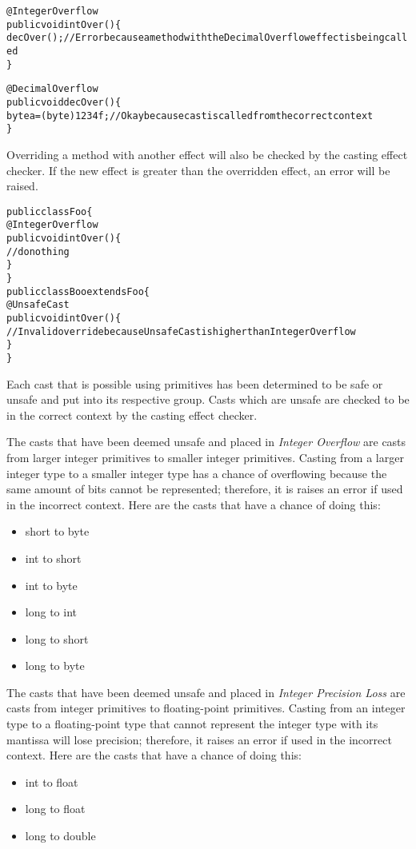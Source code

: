 \begin{alltt}
@IntegerOverflow
public void intOver() \{
    decOver(); //Error because a method with the DecimalOverflow effect is being called
\}

@DecimalOverflow
public void decOver() \{
    byte a = (byte) 1234f; //Okay because cast is called from the correct context
\}
\end{alltt}

Overriding a method with another effect will also be checked by the casting effect checker. If the new effect is greater than the overridden effect, an error will be raised.

\begin{alltt}
public class Foo \{
    @IntegerOverflow
    public void intOver() \{
        //do nothing
    \}
\}
public class Boo extends Foo \{
    @UnsafeCast
    public void intOver() \{
        //Invalid override because UnsafeCast is higher than IntegerOverflow
    \}
\}
\end{alltt}

Each cast that is possible using primitives has been determined to be safe or unsafe and put into its respective group. Casts which are unsafe are checked to be in the correct context by the casting effect checker.

The casts that have been deemed unsafe and placed in \emph{Integer Overflow} are casts from larger integer primitives to smaller integer primitives. Casting from a larger integer type to a smaller integer type has a chance of overflowing because the same amount of bits cannot be represented; therefore, it is raises an error if used in the incorrect context. Here are the casts that have a chance of doing this:
\begin{itemize}
\item
short to byte
\item
int to short
\item
int to byte
\item
long to int
\item
long to short
\item
long to byte
\end{itemize}

The casts that have been deemed unsafe and placed in \emph{Integer Precision Loss} are casts from integer primitives to floating-point primitives. Casting from an integer type to a floating-point type that cannot represent the integer type with its mantissa will lose precision; therefore, it raises an error if used in the incorrect context. Here are the casts that have a chance of doing this:
\begin{itemize}
\item
int to float
\item
long to float
\item
long to double
\end{itemize}

